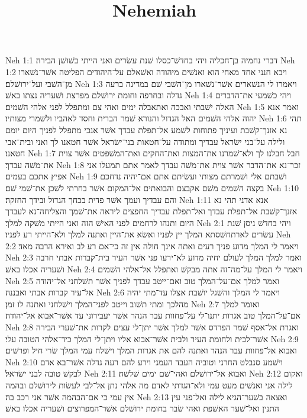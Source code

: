 

\title{Nehemiah}

Neh 1:1  דברי נחמיה בן־חכליה ויהי בחדשׁ־כסלו שׁנת עשׂרים ואני הייתי בשׁושׁן הבירה׃
Neh 1:2  ויבא חנני אחד מאחי הוא ואנשׁים מיהודה ואשׁאלם על־היהודים הפליטה אשׁר־נשׁארו מן־השׁבי ועל־ירושׁלם׃
Neh 1:3  ויאמרו לי הנשׁארים אשׁר־נשׁארו מן־השׁבי שׁם במדינה ברעה גדלה ובחרפה וחומת ירושׁלם מפרצת ושׁעריה נצתו באשׁ׃
Neh 1:4  ויהי כשׁמעי את־הדברים האלה ישׁבתי ואבכה ואתאבלה ימים ואהי צם ומתפלל לפני אלהי השׁמים׃
Neh 1:5  ואמר אנא יהוה אלהי השׁמים האל הגדול והנורא שׁמר הברית וחסד לאהביו ולשׁמרי מצותיו׃
Neh 1:6  תהי נא אזנך־קשׁבת ועיניך פתוחות לשׁמע אל־תפלת עבדך אשׁר אנכי מתפלל לפניך היום יומם ולילה על־בני ישׂראל עבדיך ומתודה על־חטאות בני־ישׂראל אשׁר חטאנו לך ואני ובית־אבי חטאנו׃
Neh 1:7  חבל חבלנו לך ולא־שׁמרנו את־המצות ואת־החקים ואת־המשׁפטים אשׁר צוית את־משׁה עבדך׃
Neh 1:8  זכר־נא את־הדבר אשׁר צוית את־משׁה עבדך לאמר אתם תמעלו אני אפיץ אתכם בעמים׃
Neh 1:9  ושׁבתם אלי ושׁמרתם מצותי ועשׂיתם אתם אם־יהיה נדחכם בקצה השׁמים משׁם אקבצם והבואתים אל־המקום אשׁר בחרתי לשׁכן את־שׁמי שׁם׃
Neh 1:10  והם עבדיך ועמך אשׁר פדית בכחך הגדול ובידך החזקה׃
Neh 1:11  אנא אדני תהי נא אזנך־קשׁבת אל־תפלת עבדך ואל־תפלת עבדיך החפצים ליראה את־שׁמך והצליחה־נא לעבדך היום ותנהו לרחמים לפני האישׁ הזה ואני הייתי משׁקה למלך׃
Neh 2:1  ויהי בחדשׁ ניסן שׁנת עשׂרים לארתחשׁסתא המלך יין לפניו ואשׂא את־היין ואתנה למלך ולא־הייתי רע לפניו׃
Neh 2:2  ויאמר לי המלך מדוע פניך רעים ואתה אינך חולה אין זה כי־אם רע לב ואירא הרבה מאד׃
Neh 2:3  ואמר למלך המלך לעולם יחיה מדוע לא־ירעו פני אשׁר העיר בית־קברות אבתי חרבה ושׁעריה אכלו באשׁ׃
Neh 2:4  ויאמר לי המלך על־מה־זה אתה מבקשׁ ואתפלל אל־אלהי השׁמים׃
Neh 2:5  ואמר למלך אם־על־המלך טוב ואם־ייטב עבדך לפניך אשׁר תשׁלחני אל־יהודה אל־עיר קברות אבתי ואבננה׃
Neh 2:6  ויאמר לי המלך והשׁגל יושׁבת אצלו עד־מתי יהיה מהלכך ומתי תשׁוב וייטב לפני־המלך וישׁלחני ואתנה לו זמן׃
Neh 2:7  ואומר למלך אם־על־המלך טוב אגרות יתנו־לי על־פחוות עבר הנהר אשׁר יעבירוני עד אשׁר־אבוא אל־יהודה׃
Neh 2:8  ואגרת אל־אסף שׁמר הפרדס אשׁר למלך אשׁר יתן־לי עצים לקרות את־שׁערי הבירה אשׁר־לבית ולחומת העיר ולבית אשׁר־אבוא אליו ויתן־לי המלך כיד־אלהי הטובה עלי׃
Neh 2:9  ואבוא אל־פחוות עבר הנהר ואתנה להם את אגרות המלך וישׁלח עמי המלך שׂרי חיל ופרשׁים׃
Neh 2:10  וישׁמע סנבלט החרני וטוביה העבד העמני וירע להם רעה גדלה אשׁר־בא אדם לבקשׁ טובה לבני ישׂראל׃
Neh 2:11  ואבוא אל־ירושׁלם ואהי־שׁם ימים שׁלשׁה׃
Neh 2:12  ואקום לילה אני ואנשׁים מעט עמי ולא־הגדתי לאדם מה אלהי נתן אל־לבי לעשׂות לירושׁלם ובהמה אין עמי כי אם־הבהמה אשׁר אני רכב בה׃
Neh 2:13  ואצאה בשׁער־הגיא לילה ואל־פני עין התנין ואל־שׁער האשׁפת ואהי שׂבר בחומת ירושׁלם אשׁר־המפרוצים ושׁעריה אכלו באשׁ׃
